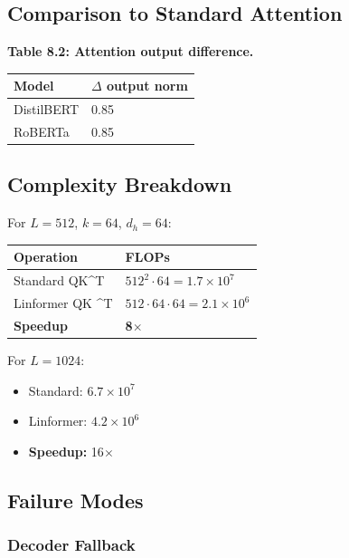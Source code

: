 \subsection{Comparison to Standard Attention}

\textbf{Table 8.2: Attention output difference.}

\begin{table}[H]
\centering
\small
\begin{tabular}{ll}
\toprule
\textbf{Model} & \textbf{$\Delta$ output norm} \\
\midrule
DistilBERT & 0.85 \\
RoBERTa & 0.85 \\
\bottomrule
\end{tabular}
\end{table}

\subsection{Complexity Breakdown}

For $L = 512$, $k = 64$, $d_h = 64$:

\begin{table}[H]
\centering
\small
\begin{tabular}{ll}
\toprule
\textbf{Operation} & \textbf{FLOPs} \\
\midrule
Standard QK^T & $512^2 \cdot 64 = 1.7 \times 10^7$ \\
Linformer QK ^T & $512 \cdot 64 \cdot 64 = 2.1 \times 10^6$ \\
\textbf{Speedup} & \textbf{8$\times$} \\
\bottomrule
\end{tabular}
\end{table}

For $L = 1024$:
\begin{itemize}
\item Standard: $6.7 \times 10^7$
\item Linformer: $4.2 \times 10^6$
\item \textbf{Speedup:} 16$\times$

\end{itemize}
\subsection{Failure Modes}

\subsubsection{Decoder Fallback}

